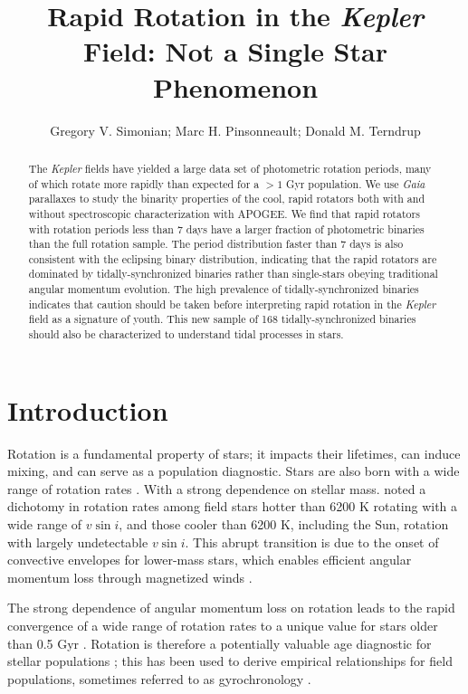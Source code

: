 \documentclass[manuscript]{aastex6}
\newcommand{\vsini}{\ensuremath{v \sin i}}
\newcommand{\Kepler}{\mbox{\textit{Kepler}}}
\newcommand{\Gaia}{\mbox{\textit{Gaia}}}
\begin{document}
\title{Rapid Rotation in the \Kepler{} Field: Not a Single Star
Phenomenon}
\author{Gregory V. Simonian; Marc H. Pinsonneault; Donald M. Terndrup}

\begin{abstract}
    The \Kepler{} fields have yielded a large data set of photometric rotation
    periods, many of which rotate more rapidly than expected for a \(> 1\) Gyr
    population. We use \Gaia{} parallaxes to study the binarity properties of
    the cool, rapid rotators both with and without spectroscopic
    characterization with APOGEE\@. We find that rapid rotators with rotation
    periods less than 7 days have a larger fraction of photometric binaries
    than the full rotation sample. The period distribution faster than 7 days
    is also consistent with the eclipsing binary distribution, indicating that
    the rapid rotators are dominated by tidally-synchronized binaries rather
    than single-stars obeying traditional angular momentum evolution. The high
    prevalence of tidally-synchronized binaries indicates that caution should
    be taken before interpreting rapid rotation in the \Kepler{} field as a
    signature of youth. This new sample of 168 tidally-synchronized binaries
    should also be characterized to understand tidal processes in stars.
\end{abstract}


\section{Introduction}

Rotation is a fundamental property of stars; it impacts their lifetimes, can
induce mixing, and can serve as a population diagnostic. Stars are also born 
with a wide range of rotation rates \citep{Attridge92, Herbst00, Henderson12}.
With a strong dependence on stellar mass. \citet{Kraft67} noted a dichotomy in
rotation rates among field stars hotter than 6200 K rotating with a wide range
of \vsini, and those cooler than 6200 K, including the Sun, rotation with
largely undetectable \vsini. This abrupt transition is due to the onset of
convective envelopes for lower-mass stars, which enables efficient angular
momentum loss through magnetized winds \citep{Parker58,Weber67}.

The strong dependence of angular momentum loss on rotation \citep{Kawaler88}
leads to the rapid convergence of a wide range of rotation rates to a unique
value for stars older than 0.5 Gyr \citep{Pinsonneault89}. Rotation is
therefore a potentially valuable age diagnostic for stellar populations
\citep{Skumanich72}; this has been used to derive empirical relationships for
field populations, sometimes referred to as gyrochronology \citep{Barnes07,
Mamajek08, Meibom09}.  
\end{document}
